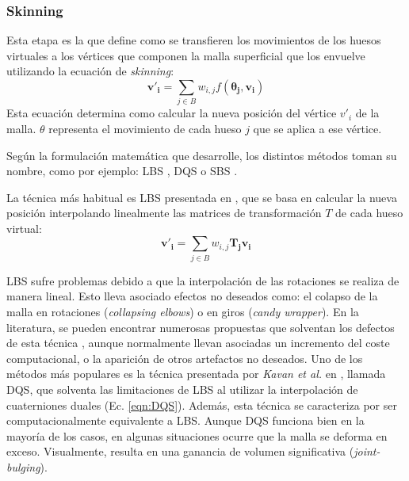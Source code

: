 \subsubsection{Skinning}
\label{art:skinning}

Esta etapa es la que define como se transfieren los movimientos de los huesos virtuales a los vértices que componen la malla superficial que los envuelve utilizando la ecuación de \emph{skinning}: 
\begin{equation}
\label{eqn:skinning}
\mathbf{v'_{i}} = \sum_{j \in B} w_{i,j}f(\mathbf{\theta_{j}},\mathbf{v_{i}}) 
\end{equation}
Esta ecuación determina como calcular la nueva posición del vértice $v'_{i}$ de la malla. $\theta$ representa el movimiento de cada hueso $j$ que se aplica a ese vértice. %

Según la formulación matemática que desarrolle, los distintos métodos toman su nombre, como por ejemplo: \ac{LBS} \cite{thalmann88}, \ac{DQS} \cite{Kavan2008} o \ac{SBS} \cite{Kavan:2005}.



La técnica más habitual es \ac{LBS} presentada en \cite{thalmann88}, que se basa en calcular la nueva posición interpolando linealmente las matrices de transformación $T$ de cada hueso virtual:
\begin{equation}
\label{eqn:LBS}
\mathbf{v'_{i}} = \sum_{j \in B} w_{i,j}\mathbf{T_{j}v_{i}}
\end{equation}

\ac{LBS} sufre problemas debido a que la interpolación de las rotaciones se realiza de manera lineal. Esto lleva asociado efectos no deseados como: el colapso de la malla  en rotaciones (\emph{collapsing elbows}) o en giros (\emph{candy wrapper}). En la literatura, se pueden encontrar numerosas propuestas que solventan los defectos de esta técnica \cite{rumman2016state}, aunque normalmente llevan asociadas un incremento del coste computacional, o la aparición de otros artefactos no deseados. Uno de los métodos más populares es la técnica presentada por \emph{Kavan et al.} en \cite{Kavan2008}, llamada \ac{DQS}, que solventa las limitaciones de \ac{LBS} al utilizar la interpolación de cuaterniones duales (Ec. \ref{eqn:DQS}). Además, esta técnica se caracteriza por ser computacionalmente equivalente a \ac{LBS}. Aunque \ac{DQS} funciona bien en la mayoría de los casos, en algunas situaciones ocurre que la malla se deforma en exceso. Visualmente, resulta en una ganancia de volumen significativa (\emph{joint-bulging}). 

